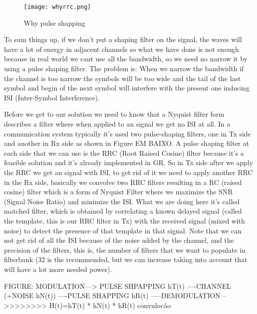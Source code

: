 \documentclass[a4paper, 10pt, conference]{ieeeconf}      %
\begin{document}
    \begin{figure}
        \centering
        \texttt{[image: whyrrc.png]}
        \caption{Why pulse shapping}
        \label{fig:whyrrc}
    \end{figure}
    
    To sum things up, if we don't put a shaping filter on the signal, the waves will have a lot of energy in adjacent channels so what we have done is not enough because in real world we cant use all the bandwidth, so we need no narrow it by using a pulse shaping filter. The problem is: When we narrow the bandwidth if the channel is too narrow the symbols will be too wide and the tail of the last symbol and begin of the next symbol will interfere with the present one inducing ISI (Inter-Symbol Interference). 
    
    Before we get to our solution we need to know that a Nyquist filter form describes a filter where when applied to an signal we get no ISI at all. In a communication system typically it's used two pulse-shaping filters, one in Tx side and another in Rx side as shown in Figure EM BAIXO. A pulse shaping filter at each side that we can use is the RRC (Root Raised Cosine) filter because it's a feasible solution and it's already implemented in GR. So in Tx side after we apply the RRC we get an signal with ISI, to get rid of it we need to apply another RRC in the Rx side, basically we convolve two RRC filters resulting in a RC (raised cosine) filter which is a form of Nyquist Filter where we maximize the SNR (Signal Noise Ratio) and minimize the ISI. What we are doing here it's called matched filter, which is obtained by correlating a known delayed signal (called the template, this is our RRC filter in Tx) with the received signal (mixed with noise) to detect the presence of that template in that signal. Note that we can not get rid of all the ISI because of the noise added by the channel, and the precision of the filters, this is, the number of filters that we want to populate in filterbank (32 is the recommended, but we can increase taking into account that will have a lot more needed power).
    
    FIGURE: MODULATION---> PULSE SHPAPPING hT(t) ----CHANNEL (+NOISE hN(t)) ----PULSE SHAPPING hR(t) -----DEMODULATION   -->>>>>>>> H(t)=hT(t) * hN(t) * hR(t) convulocão
\end{document}
